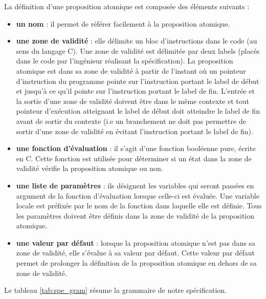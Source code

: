 La définition d'une proposition atomique est composée des éléments suivants :

\begin{itemize}
\item
  \textbf{un nom} : il permet de référer facilement à la proposition atomique.
\item
  \textbf{une zone de validité} : elle délimite un bloc d'instructions dans
  le code (au sens du langage C). Une zone de validité est délimitée par deux
  labels (placés dans le code par l'ingénieur réalisant la spécification). La
  proposition atomique est dans sa zone de validité à partir de l'instant où un
  pointeur d'instruction du programme pointe sur l'instruction portant le label
  de début et jusqu'à ce qu'il pointe sur l'instruction portant le label de fin.
  L'entrée et la sortie d'une zone de validité doivent être dans le même
  contexte et tout pointeur d'exécution atteignant le label de début doit
  atteindre le label de fin avant de sortir du contexte (i.e un branchement ne
  doit pas permettre de sortir d'une zone de validité en évitant l'instruction
  portant le label de fin).
\item
  \textbf{une fonction d'évaluation} : il s'agit d'une fonction booléenne pure,
  écrite en C. Cette fonction est utilisée pour déterminer si un état
  dans la zone de validité vérifie la proposition atomique ou non.
\item
\textbf{une liste de paramètres} : ils désignent les variables qui seront
  passées en argument de la fonction d'évaluation lorsque celle-ci est évaluée.
  Une variable locale est préfixée par le nom de la fonction dans laquelle elle
  est définie. Tous les paramètres doivent être définis dans la zone de validité
  de la proposition atomique.
\item
  \textbf{une valeur par défaut} : lorsque la proposition atomique n'est pas dans
  sa zone de validité, elle s'évalue à sa valeur par défaut. Cette valeur par
  défaut permet de prolonger la définition de la proposition atomique en dehors
  de sa zone de validité.
\end{itemize}

Le tableau \ref{tab:spe_gram} résume la grammaire de notre spécification.

